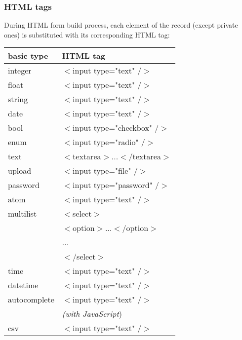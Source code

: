\subsubsection{HTML tags}
During HTML form build process, each element of the record (except private ones) is substituted with its corresponding HTML tag:
\begin{longtable}{|p{}|p{}|}
\hline
{\bf basic type} & {\bf HTML tag}\\
\hline\hline
integer & $<$input type="text" /$>$\\
\hline
float & $<$input type="text" /$>$\\
\hline
string & $<$input type="text" /$>$\\
\hline
date & $<$input type="text" /$>$\\
\hline
bool & $<$input type="checkbox" /$>$\\
\hline
enum & $<$input type="radio" /$>$\\
\hline
text & $<$textarea$>$...$<$/textarea$>$\\
\hline
upload & $<$input type="file" /$>$\\
\hline
password & $<$input type="password" /$>$\\
\hline
atom & $<$input type="text" /$>$\\
\hline
multilist & $<$select$>$\\
& $<$option$>$...$<$/option$>$\\
& ...\\
& $<$/select$>$\\
\hline
time & $<$input type="text" /$>$\\
\hline
datetime & $<$input type="text" /$>$\\
\hline
autocomplete & $<$input type="text" /$>$\\
& {\it (with JavaScript})\\
\hline
csv &  $<$input type="text" /$>$\\
\hline
\end{longtable}
